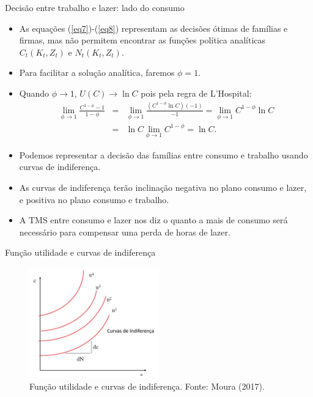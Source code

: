 \documentclass[10pt]{beamer}
\begin{document}
\begin{frame}{Decisão entre trabalho e lazer: lado do consumo}
    \begin{itemize}
        \item As equações (\ref{eq7})-(\ref{eq8}) representam as decisões ótimas de famílias e firmas, mas não permitem encontrar as funções política analíticas $C_t(K_t, Z_t)$ e $N_t(K_t, Z_t)$.
        \medskip
        \item Para facilitar a solução analítica, faremos $\phi = 1$.
        \medskip
        \item Quando $\phi \to 1$, $U(C) \to \ln C$ pois pela regra de L'Hospital:
        \begin{eqnarray*}
        \lim_{\phi \to 1} \frac{C^{1-\phi}-1}{1-\phi} &=& \lim_{\phi \to 1} \frac{(C^{1-\phi} \ln C) (-1)}{-1} = \lim_{\phi \to 1} C^{1-\phi}\ln C \\
        &=& \ln C \lim_{\phi \to 1} C^{1-\phi} = \ln C.
        \end{eqnarray*}
        \medskip
        \item Podemos representar a decisão das famílias entre consumo e trabalho usando curvas de indiferença.
        \medskip
        \item As curvas de indiferença terão inclinação negativa no plano consumo e lazer, e positiva no plano consumo e trabalho.
        \medskip
        \item A TMS entre consumo e lazer nos diz o quanto a mais de consumo será necessário para compensar uma perda de horas de lazer.
    \end{itemize}
\end{frame}

\begin{frame}{Função utilidade e curvas de indiferença}
    \begin{figure}
        \centering
        \includegraphics[width=0.5\textwidth]{./figures/aula14_fig8.PNG}
        \caption{Função utilidade e curvas de indiferença. Fonte: Moura (2017).}
        \label{fig8}
    \end{figure}
\end{frame}
\end{document}
